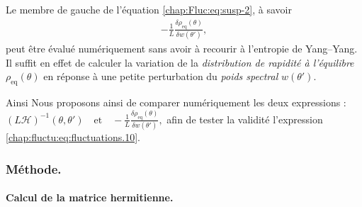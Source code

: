 \medskip

Le membre de gauche de l’équation \eqref{chap:Fluc:eq:susp-2}, à savoir
\begin{eqnarray*}
- \frac{1}{L} \frac{\delta \rho_{\mathrm{eq}}(\theta)}{\delta w(\theta')},
\end{eqnarray*}
peut être évalué numériquement sans avoir à recourir à l'entropie de Yang–Yang. Il suffit en effet de calculer la variation de la {\em distribution de rapidité à l'équilibre} $\rho_{\mathrm{eq}}(\theta)$ en réponse à une petite perturbation du {\em poids spectral} $w(\theta')$.

\medskip

Ainsi Nous proposons ainsi de comparer numériquement les deux expressions :
\(
\left( L \mathcal{H} \right)^{-1} (\theta, \theta') \quad \text{et} \quad - \frac{1}{L} \frac{\delta \rho_{\mathrm{eq}}(\theta)}{\delta w(\theta')},
\)
afin de tester la validité l’expression \eqref{chap:fluctu:eq:fluctuations.10}.


\subsubsection{Méthode.} 

\paragraph{Calcul de la matrice hermitienne.}


